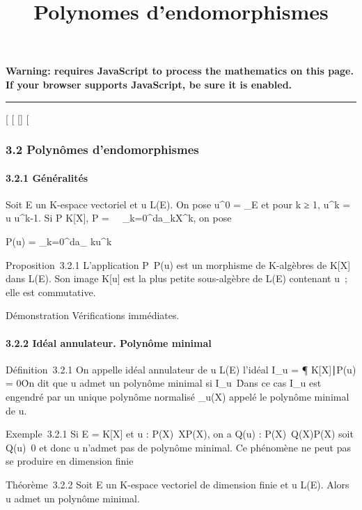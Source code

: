 \documentclass[]{article}
\title{Polynomes d'endomorphismes}
\author{}
\date{}
\begin{document}
\maketitle

\textbf{Warning: 
requires JavaScript to process the mathematics on this page.\\ If your
browser supports JavaScript, be sure it is enabled.}

\begin{center}\rule{3in}{0.4pt}\end{center}

[
[
[]
[

\subsubsection{3.2 Polynômes d'endomorphismes}

\paragraph{3.2.1 Généralités}

Soit E un K-espace vectoriel et u \in L(E). On pose u^0 =
\mathrmId_E et pour k ≥ 1, u^k = u
\cdot u^k-1. Si P \in K[X], P =\
\sum ~
_k=0^da_kX^k, on pose

P(u) = \sum _k=0^da_
ku^k

Proposition~3.2.1 L'application P\mapsto~P(u) est un
morphisme de K-algèbres de K[X] dans L(E). Son image K[u] est la
plus petite sous-algèbre de L(E) contenant u~; elle est commutative.

Démonstration Vérifications immédiates.

\paragraph{3.2.2 Idéal annulateur. Polynôme minimal}

Définition~3.2.1 On appelle idéal annulateur de u \in L(E) l'idéal
I_u = \P \in
K[X]∣P(u) = 0\. On dit
que u admet un polynôme minimal si
I_u\neq~\0\.
Dans ce cas I_u est engendré par un unique polynôme normalisé
\mu_u(X) appelé le polynôme minimal de u.

Exemple~3.2.1 Si E = K[X] et u :
P(X)\mapsto~XP(X), on a Q(u) :
P(X)\mapsto~Q(X)P(X) soit
Q(u)\neq~0 et donc u n'admet pas de polynôme
minimal. Ce phénomène ne peut pas se produire en dimension finie

Théorème~3.2.2 Soit E un K-espace vectoriel de dimension finie et u \in
L(E). Alors u admet un polynôme minimal.
\end{document}
